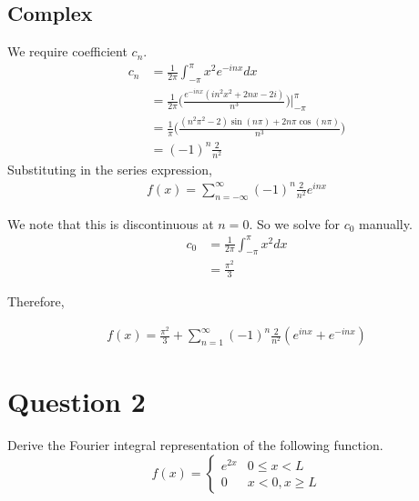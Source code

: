 \documentclass[12pt]{article}
\begin{document}
\subsection*{Complex}
We require coefficient $c_n$.
\begin{align*}
  c_n &= \frac{1}{2\pi}\int_{-\pi}^{\pi} x^2e^{-inx} dx \\
  &= \frac{1}{2\pi} \bigg( \frac{e^{-inx}(in^2x^2 + 2nx - 2i)}{n^3}\bigg) \bigg|_{-\pi}^{\pi} \\
  &= \frac{1}{\pi} \bigg( \frac{(n^2\pi^2-2)\sin(n\pi) + 2n\pi\cos(n\pi)}{n^3}\bigg) \\
  &= (-1)^n \frac{2}{n^2} \tag{1 mark}
\end{align*}
Substituting in the series expression,
\begin{align*}
f(x) = \sum_{n=-\infty}^{\infty} (-1)^n \frac{2}{n^2} e^{inx}
\end{align*}

\noindent We note that this is discontinuous at $n = 0$. So we solve for $c_0$ manually.
\begin{align*}
    c_0 &= \frac{1}{2\pi}\int_{-\pi}^{\pi} x^2 dx \\
        &= \frac{\pi^2}{3} \tag{1 mark}
\end{align*}

\noindent Therefore,

\begin{align*}
    f(x) = \frac{\pi^2}{3} + \sum_{n=1}^{\infty} (-1)^n \frac{2}{n^2} (e^{inx} + e^{-inx}) \tag{1 mark}
\end{align*}

\section*{Question 2}
Derive the Fourier integral representation of the following function.
$$f(x) =
\begin{cases}
e^{2x} & 0 \leq x < L \\
0 & x < 0, x \geq L
\end{cases}$$
\end{document}
